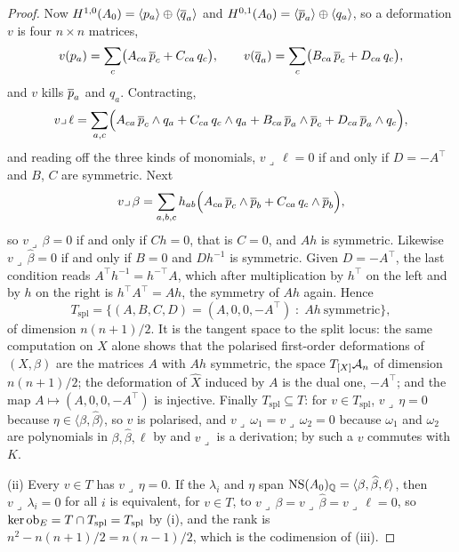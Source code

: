 \begin{proof}
Now $H^{1,0}(A_{0})=\langle p_{a}\rangle\oplus\langle\overline{q}_{a}\rangle$ and
$H^{0,1}(A_{0})=\langle\overline{p}_{a}\rangle\oplus\langle q_{a}\rangle$, so a
deformation $v$ is four $n\times n$ matrices,
\[
  v(p_{a})=\sum_{c}\bigl(A_{ca}\,\overline{p}_{c}+C_{ca}\,q_{c}\bigr),
  \qquad
  v(\overline{q}_{a})=\sum_{c}\bigl(B_{ca}\,\overline{p}_{c}+D_{ca}\,q_{c}\bigr),
\]
and $v$ kills $\overline{p}_{a}$ and $q_{a}$. Contracting,
\[
  v\lrcorner\,\ell
  =\sum_{a,c}\Bigl(A_{ca}\,\overline{p}_{c}\wedge q_{a}+C_{ca}\,q_{c}\wedge q_{a}
   +B_{ca}\,\overline{p}_{a}\wedge\overline{p}_{c}+D_{ca}\,\overline{p}_{a}\wedge q_{c}\Bigr),
\]
and reading off the three kinds of monomials, $v\lrcorner\,\ell=0$ if and only
if $D=-A^{\top}$ and $B$, $C$ are symmetric. Next
\[
  v\lrcorner\,\beta
  =\sum_{a,b,c}h_{ab}\Bigl(A_{ca}\,\overline{p}_{c}\wedge\overline{p}_{b}
   +C_{ca}\,q_{c}\wedge\overline{p}_{b}\Bigr),
\]
so $v\lrcorner\,\beta=0$ if and only if $Ch=0$, that is $C=0$, and $Ah$ is
symmetric. Likewise $v\lrcorner\,\widehat\beta=0$ if and only if $B=0$ and
$Dh^{-1}$ is symmetric. Given $D=-A^{\top}$, the last condition reads
$A^{\top}h^{-1}=h^{-\top}A$, which after multiplication by $h^{\top}$ on the
left and by $h$ on the right is $h^{\top}A^{\top}=Ah$, the symmetry of $Ah$
again. Hence
\[
  T_{\mathrm{spl}}=\bigl\{(A,B,C,D)=(A,0,0,-A^{\top})\;:\;Ah\ \text{symmetric}\bigr\},
\]
of dimension $n(n+1)/2$. It is the tangent space to the split locus: the
same computation on $X$ alone shows that the polarised first-order
deformations of $(X,\beta)$ are the matrices $A$ with $Ah$ symmetric, the
space $T_{[X]}\mathcal{A}_{n}$ of dimension $n(n+1)/2$; the deformation of
$\widehat X$ induced by $A$ is the dual one, $-A^{\top}$; and the map
$A\mapsto(A,0,0,-A^{\top})$ is injective. Finally $T_{\mathrm{spl}}\subseteq
T$: for $v\in T_{\mathrm{spl}}$, $v\lrcorner\,\eta=0$ because
$\eta\in\langle\beta,\widehat\beta\rangle$, so $v$ is polarised, and
$v\lrcorner\,\omega_{1}=v\lrcorner\,\omega_{2}=0$ because $\omega_{1}$ and
$\omega_{2}$ are polynomials in $\beta,\widehat\beta,\ell$ by
 and $v\lrcorner$ is a derivation; by
 such a $v$ commutes with $K$.

(ii) Every $v\in T$ has $v\lrcorner\,\eta=0$. If the $\lambda_{i}$ and
$\eta$ span $\mathrm{NS}(A_{0})_{\mathbb{Q}}=\langle\beta,\widehat\beta,\ell\rangle$, then
$v\lrcorner\,\lambda_{i}=0$ for all $i$ is equivalent, for $v\in T$, to
$v\lrcorner\,\beta=v\lrcorner\,\widehat\beta=v\lrcorner\,\ell=0$, so
$\ker\operatorname{ob}_{E}=T\cap T_{\mathrm{spl}}=T_{\mathrm{spl}}$ by (i), and the rank
is $n^{2}-n(n+1)/2=n(n-1)/2$, which is the codimension of
(iii).


\end{proof}
